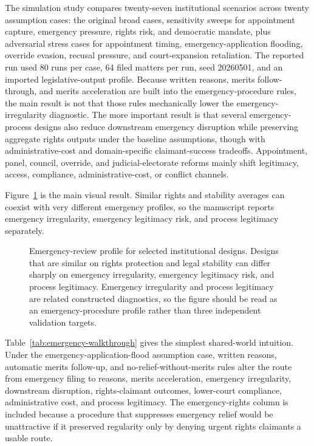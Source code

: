 \documentclass[
    journal=jlc,
    manuscript=research-article,
    year=2026,
  ]{cup-journal}
\providecommand{\Description}[1]{}
\begin{document}
The simulation study compares twenty-seven institutional scenarios across twenty assumption cases: the original broad cases, sensitivity sweeps for appointment capture, emergency pressure, rights risk, and democratic mandate, plus adversarial stress cases for appointment timing, emergency-application flooding, override evasion, recusal pressure, and court-expansion retaliation. The reported run used 80 runs per case, 64 filed matters per run, seed 20260501, and an imported legislative-output profile. Because written reasons, merits follow-through, and merits acceleration are built into the emergency-procedure rules, the main result is not that those rules mechanically lower the emergency-irregularity diagnostic. The more important result is that several emergency-process designs also reduce downstream emergency disruption while preserving aggregate rights outputs under the baseline assumptions, though with administrative-cost and domain-specific claimant-success tradeoffs. Appointment, panel, council, override, and judicial-electorate reforms mainly shift legitimacy, access, compliance, administrative-cost, or conflict channels.

Figure~\ref{fig:emergency-profile} is the main visual result. Similar rights and stability averages can coexist with very different emergency profiles, so the manuscript reports emergency irregularity, emergency legitimacy risk, and process legitimacy separately.

\begin{figure}[hbt!]
\centering

\caption{Emergency-review profile for selected institutional designs. Designs that are similar on rights protection and legal stability can differ sharply on emergency irregularity, emergency legitimacy risk, and process legitimacy. Emergency irregularity and process legitimacy are related constructed diagnostics, so the figure should be read as an emergency-procedure profile rather than three independent validation targets.}
\Description{Horizontal bar chart comparing emergency irregularity, emergency legitimacy risk, and process legitimacy across selected court designs.}
\label{fig:emergency-profile}
\end{figure}



Table~\ref{tab:emergency-walkthrough} gives the simplest shared-world intuition. Under the emergency-application-flood assumption case, written reasons, automatic merits follow-up, and no-relief-without-merits rules alter the route from emergency filing to reasons, merits acceleration, emergency irregularity, downstream disruption, rights-claimant outcomes, lower-court compliance, administrative cost, and process legitimacy. The emergency-rights column is included because a procedure that suppresses emergency relief would be unattractive if it preserved regularity only by denying urgent rights claimants a usable route.
\end{document}
